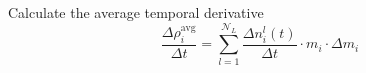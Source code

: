 Calculate the average temporal derivative
\begin{equation}
    \frac{\Delta \rho^\text{avg}_i}{\Delta t} 
    = \sum_{l=1}^{\mathcal N_L} \frac{\Delta n_i^l(t)}{\Delta t} \cdot m_i \cdot \Delta m_i
\end{equation}

 \\
 \\


